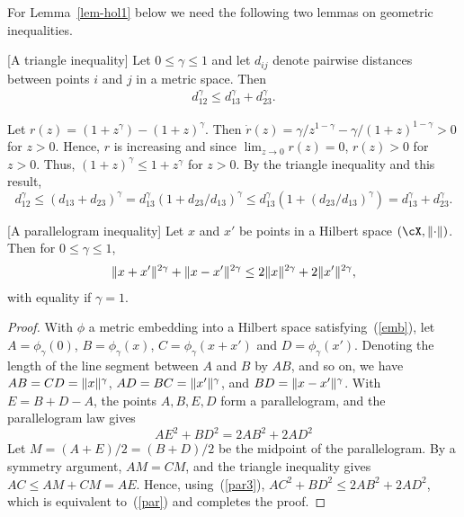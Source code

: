 \documentclass[preprint,12pt,authoryear]{elsarticle}
\DeclarePairedDelimiter{\norm}{\lVert}{\rVert}
\begin{document}
For Lemma~\ref{lem-hol1} below we need the following two lemmas on geometric inequalities.



\begin{lemma}\label{lem-tri}
	[A triangle inequality] Let $0\le\gamma\le 1$ and let $d_{ij}$ denote pairwise distances between points $i$ and $j$ in a metric space. Then
	\begin{eqnarray}\label{tri}
	d_{12}^\gamma \le d_{13}^\gamma + d_{23}^\gamma .
	\end{eqnarray}
\end{lemma}
\proof[Proof]
Let $r(z)=(1+z^\gamma)-(1+z)^\gamma$. Then $\dot r(z)=\gamma/z^{1-\gamma}-\gamma/(1+z)^{1-\gamma}>0$ for $z>0$. Hence, $r$ is increasing and since $\lim_{z\rightarrow 0}r(z)=0$, $r(z)>0$ for $z>0$.
Thus, $(1+z)^\gamma\le 1+z^\gamma$ for $z>0$.
By the triangle inequality and this result,
\[  d_{12}^\gamma \le (d_{13}+d_{23})^\gamma = d_{13}^\gamma(1+d_{23}/d_{13})^\gamma \le d_{13}^\gamma(1 + (d_{23}/d_{13})^\gamma) = d_{13}^\gamma + d_{23}^\gamma.
\]
\endproof

\begin{lemma}\label{lem-par} [A parallelogram inequality]
	Let $x$ and $x'$ be points in a Hilbert space $(\cX,\norm{\cdot})$. Then for $0\le\gamma\le 1$,
	\begin{eqnarray}\label{par}
	\norm{x+x'}^{2\gamma} + \norm{x-x'}^{2\gamma} \le 2\norm{x}^{2\gamma} + 2\norm{x'}^{2\gamma},
	\end{eqnarray}
	with equality if $\gamma=1$.
\end{lemma}
\begin{proof}
	With $\phi$ a metric embedding into a Hilbert space satisfying~(\ref{emb}), let $A=\phi_{\gamma}(0)$, $B=\phi_{\gamma}(x)$, $C=\phi_{\gamma}(x+x')$ and $D=\phi_{\gamma}(x')$. Denoting the length of the line segment between $A$ and $B$ by $AB$, and so on, we have $AB=CD=\norm{x}^{\gamma}$, $AD=BC=\norm{x'}^{\gamma}$, and $BD=\norm{x-x'}^{\gamma}$.
	With $E=B+D-A$, the points $A,B,E,D$ form a parallelogram, and the parallelogram law gives
	\begin{equation}\label{par3}  AE^2 + BD^2 = 2AB^2 + 2AD^2 \end{equation}
	Let $M=(A+E)/2=(B+D)/2$ be the midpoint of the parallelogram.
	By a symmetry argument, $AM=CM$, and the triangle inequality gives $AC\le AM+CM=AE$.
	Hence, using~(\ref{par3}), $AC^2 + BD^2 \le 2AB^2 + 2AD^2$, which is equivalent to~(\ref{par}) and completes the proof.
\end{proof}
\end{document}
